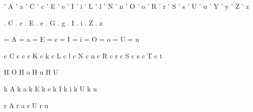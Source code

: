  ' A {\Aacute}         ' a {\aacute}
 ' C {\Cacute}         ' c {\cacute}
 ' E {\Eacute}         ' e {\eacute}
 ' I {\Iacute}         ' i {\iacute}
 ' L {\Lacute}         ' l {\lacute}
 ' N {\Nacute}         ' n {\nacute}
 ' O {\Oacute}         ' o {\oacute}
 ' R {\Racute}         ' r {\racute}
 ' S {\Sacute}         ' s {\sacute}
 ' U {\Uacute}         ' u {\uacute}
 ' Y {\Yacute}         ' y {\yacute}
 ' Z {\Zacute}         ' z {\zacute}

 . C {\Cdotaccent}     . c {\cdotaccent}
 . E {\Edotaccent}     . e {\edotaccent}
 . G {\Gdotaccent}     . g {\gdotaccent}
 . I {\Idotaccent}     . i {\idotaccent}
 . Z {\Zdotaccent}     . z {\zdotaccent}

 = A {\Amacron}        = a {\amacron}
 = E {\Emacron}        = e {\emacron}
 = I {\Imacron}        = i {\imacron}
 = O {\Omacron}        = o {\omacron}
 = U {\Umacron}        = u {\umacron}

 c C {\Ccedilla}       c c {\ccedilla}
 c K {\Kcedilla}       c k {\kcedilla}
 c L {\Lcedilla}       c l {\lcedilla}
 c N {\Ncedilla}       c n {\ncedilla}
 c R {\Rcedilla}       c r {\rcedilla}
 c S {\Scedilla}       c s {\scedilla}
 c T {\Tcedilla}       c t {\tcedilla}

 H O {\Ohungarumlaut}  H o {\ohungarumlaut}
 H u {\uhungarumlaut}  H U {\Uhungarumlaut}

 k A {\Aogonek}        k a {\aogonek}
 k E {\Eogonek}        k e {\eogonek}
 k I {\Iogonek}        k i {\iogonek}
 k U {\Uogonek}        k u {\uogonek}

 r A {\Aring}          r a {\aring}
 r U {\Uring}          r u {\uring}

